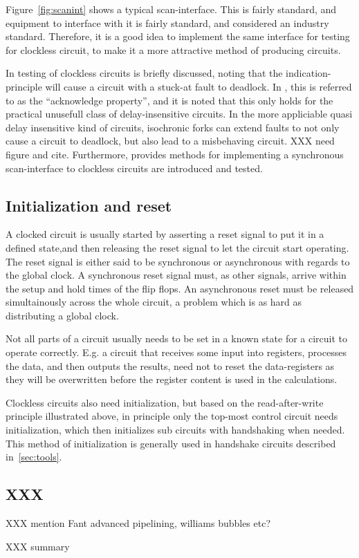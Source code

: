 Figure~\ref{fig:scanint} shows a typical scan-interface. This is
fairly standard, and equipment to interface with it is fairly
standard, and considered an industry standard. Therefore, it is
a good idea to implement the same interface for testing for clockless
circuit, to make it a more attractive method of producing circuits.

In \cite[pp. 27-28]{sparso} testing of clockless circuits is briefly
discussed, noting that the indication-principle will cause a circuit
with a stuck-at fault to deadlock. In \cite[pp. 26]{fullscan}, this is
referred to as the ``acknowledge property'', and it is noted that this
only holds for the practical unusefull class of delay-insensitive
circuits. In the more appliciable quasi delay insensitive kind of
circuits, isochronic forks can extend faults to not only cause a
circuit to deadlock, but also lead to a misbehaving circuit. XXX need
figure and cite.  Furthermore, \cite{fullscan} provides methods for
implementing a synchronous scan-interface to clockless circuits are
introduced and tested.

\subsection{Initialization and reset}

A clocked circuit is usually started by asserting a reset signal to
put it in a defined state,and then releasing the reset signal to let
the circuit start operating. The reset signal is either said to be
synchronous or asynchronous with regards to the global clock. A
synchronous reset signal must, as other signals, arrive within the
setup and hold times of the flip flops. An asynchronous reset must be
released simultainously across the whole circuit, a problem which is
as hard as distributing a global clock.

Not all parts of a circuit usually needs to be set in a known state
for a circuit to operate correctly. E.g. a circuit that receives some
input into registers, processes the data, and then outputs the
results, need not to reset the data-registers as they will be
overwritten before the register content is used in the calculations.

Clockless circuits also need initialization, but based on the
read-after-write principle illustrated above, in principle only the
top-most control circuit needs initialization, which then initializes
sub circuits with handshaking when needed. This method of
initialization is generally used in handshake circuits described
in~\ref{sec:tools}.

\subsection{XXX}

XXX mention Fant advanced pipelining, williams bubbles etc?

XXX summary
